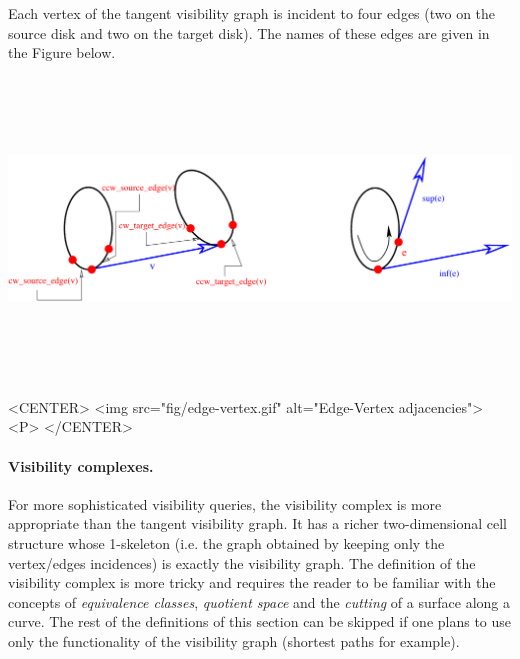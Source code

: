 Each vertex of the tangent visibility graph is incident to four edges (two
on the source disk and two on the target disk). The names of these edges
are given in the Figure below.
\begin{ccTexOnly}
    \begin{center}
        \includegraphics[height=8cm,width=\linewidth]{Visibility_complex/fig/edge-vertex}%
    \end{center}
\end{ccTexOnly}

\begin{ccHtmlOnly}
    <CENTER>
        <img src="fig/edge-vertex.gif" alt="Edge-Vertex adjacencies"><P>
    </CENTER>
\end{ccHtmlOnly}

\paragraph{Visibility complexes. }\label{VC2-vcdef}
For more sophisticated visibility queries, the visibility complex is more
appropriate than the tangent visibility graph. It has a richer
two-dimensional cell structure whose 1-skeleton (i.e. the graph obtained by
keeping only the vertex/edges incidences) is exactly the visibility
graph. The definition of the visibility complex is more tricky and requires
the reader to be familiar with the concepts of \emph{equivalence classes},
\emph{quotient space} and the \emph{cutting} of a surface along a
curve. The rest of the definitions of this section can be skipped if one
plans to use only the functionality of the visibility graph (shortest paths
for example).

